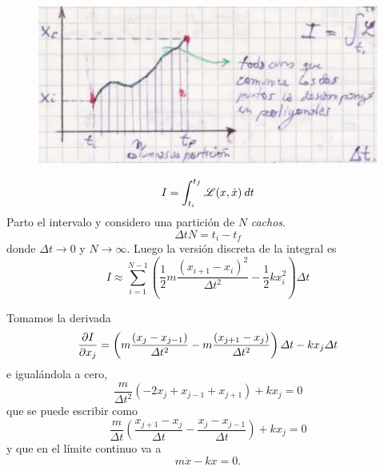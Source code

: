 \documentclass[10pt,oneside]{CBFT_book}
\begin{document}
\begin{figure}
	\begin{center}
	\includegraphics[scale=0.5]{images/fig_mc_oscarm_approx.pdf}	 
	\end{center}
	\caption{}
	\label{fig_mc_oscarm_approx}
\end{figure} 


\[
	I = \int_{t_i}^{t_f} \mathscr{L}(x,\dot{x}) \: dt
\]
Parto el intervalo y considero una partición de $N$ {\it cachos}.
\[
	\Delta t N = t_i - t_f
\]
donde $\Delta t \to 0$ y $N \to \infty $. Luego la versión discreta de la integral es 
\[
	I \approx \sum_{i=1}^{N-1} \left( \frac{1}{2}m \frac{(x_{i+1} - x_i)^2}{\Delta t^2} 
	- \frac{1}{2} k x_i^2 \right) \Delta t
\]

Tomamos la derivada
\[
	\frac{\partial^{\hspace{-0.05em}} {I}}{\partial {x_j}^{\hspace{-0.05em}}} = \left( m \frac{(x_j - x_{j-1})}{\Delta t^2} - m \frac{(x_{j+1} - x_j)}{\Delta t^2} \right) 
	\Delta t - kx_j \Delta t
\]
e igualándola a cero,
\[
	\frac{m}{\Delta t^2} ( -2x_j + x_{j-1} + x_{j+1}) + k x_j = 0
\]
que se puede escribir como 
\[
	\frac{m}{\Delta t}\left( \frac{x_{j+1} - x_j}{\Delta t} - \frac{x_j - x_{j-1}}{\Delta t} \right) + k x_j = 0
\]
y que en el límite continuo va a 
\[
	m\ddot{x} - kx = 0.
\]
\end{document}
